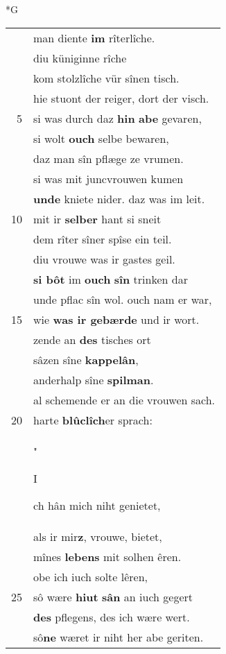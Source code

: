 \documentclass[8pt,a4paper,notitlepage]{article}
\begin{document}
\newpage
\begin{table}[ht]
\begin{minipage}[t]{0.5\linewidth}
\small
\begin{center}*G
\end{center}
\begin{tabular}{rl}
 & man diente \textbf{im} rîterlîche.\\ 
 & diu küniginne rîche\\ 
 & kom stolzlîche vür sînen tisch.\\ 
 & hie stuont der reiger, dort der visch.\\ 
5 & si was durch daz \textbf{hin} \textbf{abe} gevaren,\\ 
 & si wolt \textbf{ouch} selbe bewaren,\\ 
 & daz man sîn pflæge ze vrumen.\\ 
 & si was mit juncvrouwen kumen\\ 
 & \textbf{unde} kniete nider. daz was im leit.\\ 
10 & mit ir \textbf{selber} hant si sneit\\ 
 & dem rîter sîner spîse ein teil.\\ 
 & diu vrouwe was ir gastes geil.\\ 
 & \textbf{si bôt} im \textbf{ouch} \textbf{sîn} trinken dar\\ 
 & unde pflac sîn wol. ouch nam er war,\\ 
15 & wie \textbf{was ir gebærde} und ir wort.\\ 
 & zende an \textbf{des} tisches ort\\ 
 & sâzen sîne \textbf{kappelân},\\ 
 & anderhalp sîne \textbf{spilman}.\\ 
 & al schemende er an die vrouwen sach.\\ 
20 & harte \textbf{blûclîch}er sprach:\\ 
 & "\begin{large}I\end{large}ch hân mich niht genietet,\\ 
 & als ir mir\textbf{z}, vrouwe, bietet,\\ 
 & mînes \textbf{lebens} mit solhen êren.\\ 
 & obe ich iuch solte lêren,\\ 
25 & sô wære \textbf{hiut} \textbf{sân} an iuch gegert\\ 
 & \textbf{des} pflegens, des ich wære wert.\\ 
 & sô\textbf{ne} wæret ir niht her abe geriten.\\ 

\end{tabular}
\end{minipage}
\end{table}
\end{document}
